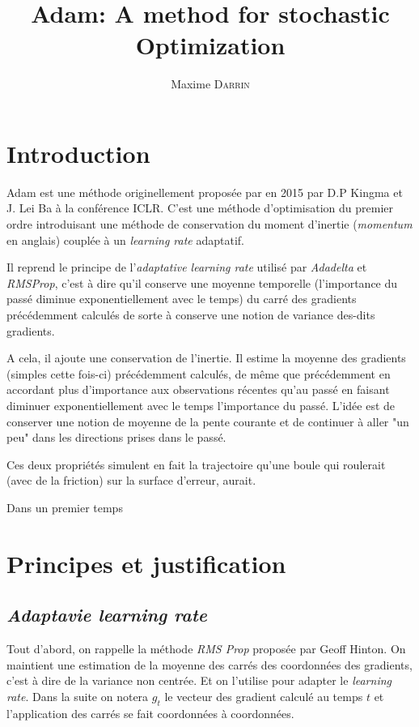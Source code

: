 \documentclass[fleqn,11pt, titlepage, french]{article}
\title{Adam: A method for stochastic Optimization}
\author{Maxime \textsc{Darrin}}
\begin{document}
	\maketitle
	\tableofcontents

	\newpage
	
	\section{Introduction}
	
	Adam est une méthode originellement proposée par en 2015 par D.P Kingma et J. Lei Ba à la conférence ICLR. C'est une méthode d'optimisation du premier ordre introduisant une méthode de conservation du moment d'inertie (\emph{momentum} en anglais) couplée à un \emph{learning rate} adaptatif.
	
	Il reprend le principe de l'\emph{adaptative learning rate} utilisé par \emph{Adadelta\cite{adadelta}} et \emph{RMSProp\cite{rmsprop}}, c'est à dire qu'il conserve une moyenne temporelle (l'importance du passé diminue exponentiellement avec le temps) du carré des gradients précédemment calculés de sorte à conserve une notion de variance des-dits gradients.
		
	A cela, il ajoute une conservation de l'inertie. Il estime la moyenne des gradients (simples cette fois-ci) précédemment calculés, de même que précédemment en accordant plus d'importance aux observations récentes qu'au passé en faisant diminuer exponentiellement avec le temps l'importance du passé. L'idée est de conserver une notion de moyenne de la pente courante et de continuer à aller "un peu" dans les directions prises dans le passé.
	
	Ces deux propriétés simulent en fait la trajectoire qu'une boule qui roulerait (avec de la friction) sur la surface d'erreur, aurait.
	
	Dans un premier temps 
	
	
	\section{Principes et justification}
	
	\subsection{\emph{Adaptavie learning rate}}
	
	Tout d'abord, on rappelle la méthode \emph{RMS Prop} proposée par Geoff Hinton\cite{rmsprop}. On maintient une estimation de la moyenne des carrés des coordonnées des gradients, c'est à dire de la variance non centrée. Et on l'utilise pour adapter le \emph{learning rate}. Dans la suite on notera $g_t$ le vecteur des gradient calculé au temps $t$ et l'application des carrés se fait coordonnées à coordonnées.
	
\end{document}
